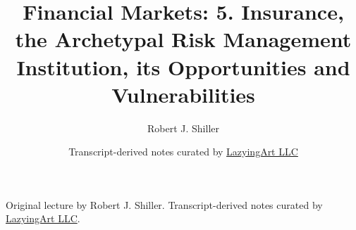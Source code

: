 \documentclass[11pt,oneside]{book}
\begin{document}
\frontmatter
\title{Financial Markets: 5. Insurance, the Archetypal Risk Management Institution, its Opportunities and Vulnerabilities}
\author{Robert J. Shiller}
\date{Transcript-derived notes curated by \href{https://lazying.art}{LazyingArt LLC}}
\maketitle
\begin{center}
\small Original lecture by Robert J. Shiller. Transcript-derived notes curated by \href{https://lazying.art}{LazyingArt LLC}.
\end{center}
\clearpage
\mainmatter

\end{document}
